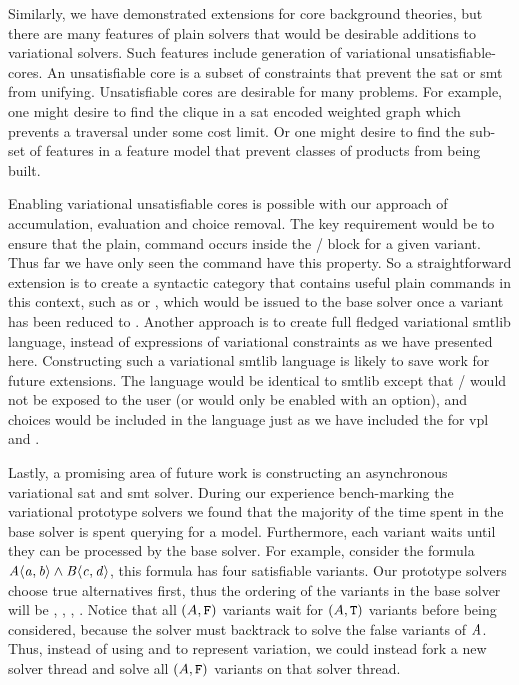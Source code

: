 Similarly, we have demonstrated extensions for core background theories, but
there are many features of plain solvers that would be desirable additions to
variational solvers. Such features include generation of variational
unsatisfiable-cores. An unsatisfiable core is a subset of constraints that
prevent the \ac{sat} or \ac{smt} from unifying. Unsatisfiable cores are
desirable for many problems. For example, one might desire to find the clique in
a \ac{sat} encoded weighted graph which prevents a traversal under some cost
limit. Or one might desire to find the sub-set of features in a feature model
that prevent classes of products from being built.

Enabling variational unsatisfiable cores is possible with our approach of
accumulation, evaluation and choice removal. The key requirement would be to
ensure that the plain,  command occurs inside the
/ block for a given variant. Thus far we have only seen the
 command have this property. So a straightforward extension is to
create a syntactic category that contains useful plain commands in this context,
such as  or , which would be issued to the base
solver once a variant has been reduced to \unit{}. Another approach is to create
full fledged variational \acl{smtlib} language, instead of expressions of
variational constraints as we have presented here. Constructing such a
variational \acl{smtlib} language is likely to save work for future extensions.
The language would be identical to \acl{smtlib} except that /
would not be exposed to the user (or would only be enabled with an option), and
choices would be included in the language just as we have included the for
\ac{vpl} and \evpl{}.

Lastly, a promising area of future work is constructing an asynchronous
variational \ac{sat} and \ac{smt} solver. During our experience bench-marking
the variational prototype solvers we found that the majority of the time spent
in the base solver is spent querying for a model. Furthermore, each variant
waits until they can be processed by the base solver. For example, consider the
formula $\kf{\chc[A]{a,b} \wedge{} \chc[B]{c,d}}$, this formula has four
satisfiable variants. Our prototype solvers choose true alternatives first, thus
the ordering of the variants in the base solver will be , , ,
. Notice that all $(A, \texttt{F}{})$ variants wait for
$(A, \texttt{T}{})$ variants before being considered, because the solver must
backtrack to solve the false variants of $\mathit{A}$. Thus, instead of using
 and  to represent variation, we could instead fork a new
solver thread and solve all $(A, \texttt{F}{})$ variants on that solver thread.

